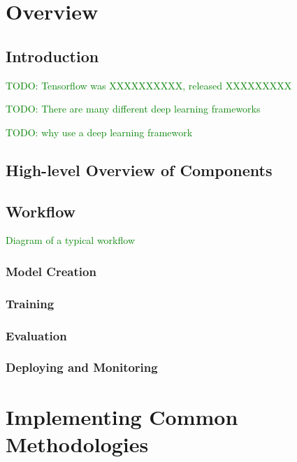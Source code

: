 \chapter{Overview}


\section{Introduction}

\textcolor{green}{TODO: Tensorflow was XXXXXXXXXX, released XXXXXXXXX}

\textcolor{green}{TODO: There are many different deep learning frameworks}

\textcolor{green}{TODO: why use a deep learning framework}

\section{High-level Overview of Components}

\section{Workflow}

\textcolor{green}{Diagram of a typical workflow}

\subsection{Model Creation}

\subsection{Training}

\subsection{Evaluation}

\subsection{Deploying and Monitoring}

\chapter{Implementing Common Methodologies}


